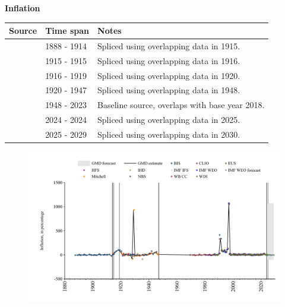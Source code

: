 \documentclass[12pt,a4paper,landscape]{article}
\begin{document}
\begin{adjustbox}{max totalsize={\paperwidth}{\paperheight},center}
\begin{minipage}[t][\textheight][t]{\textwidth}
\vspace*{0.5cm}
{}
\begin{center}
{\Large\bfseries Inflation}
\end{center}
\vspace{0.5cm}
\begin{table}[H]
\centering
\small
\begin{tabular}{|l|l|l|}
\hline
\textbf{Source} & \textbf{Time span} & \textbf{Notes} \\
\hline
\rowcolor{white}\cite{NBS}& 1888 - 1914 &Spliced using overlapping data in 1915. \\
\rowcolor{lightgray}\cite{Mitchell}& 1915 - 1915 &Spliced using overlapping data in 1916. \\
\rowcolor{white}\cite{NBS}& 1916 - 1919 &Spliced using overlapping data in 1920. \\
\rowcolor{lightgray}\cite{Mitchell}& 1920 - 1947 &Spliced using overlapping data in 1948. \\
\rowcolor{white}\cite{WB_CC}& 1948 - 2023 &Baseline source, overlaps with base year 2018. \\
\rowcolor{lightgray}\cite{BIS}& 2024 - 2024 &Spliced using overlapping data in 2025. \\
\rowcolor{white}\cite{IMF_WEO_forecast}& 2025 - 2029 &Spliced using overlapping data in 2030. \\
\hline
\end{tabular}
\end{table}
\begin{figure}[H]
\centering
\includegraphics[width=\textwidth,height=0.6\textheight,keepaspectratio]{graphs/BGR_infl.pdf}
\end{figure}
\end{minipage}
\end{adjustbox}
\end{document}
